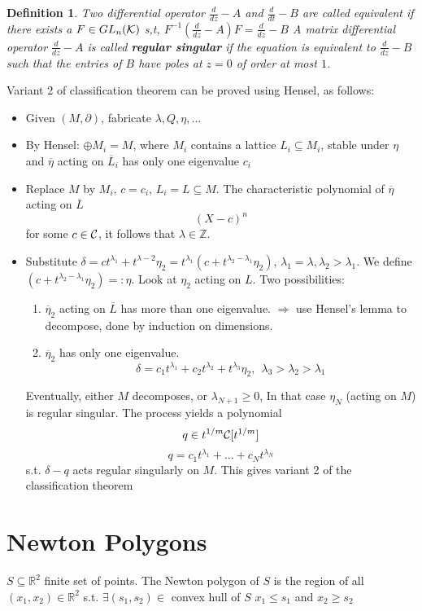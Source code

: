 \documentclass[11pt]{article}
\newtheorem{dfn}[thm]{Definition}
\newcommand{\pd}{\partial}
\newcommand{\reals}{\mathbb R}
\newcommand{\intg}{\mathbb Z}
\newcommand{\calc}{{\cal C}}
\newcommand{\calk}{{\cal K}}
\newcommand{\Lrta}{\Longrightarrow}
\begin{document}
\begin{dfn}
Two differential operator $\frac{d}{dz}-A$ and $\frac{d}{dt}-B$ are called equivalent if there exists a $F\in GL_n(\calk)$ s,t, $F^{-1}(\frac{d}{dz}-A)F=\frac{d}{dz}-B$
A matrix differential operator $\frac{d}{dz}-A$ is called \textbf{regular singular} if the equation is equivalent to $\frac{d}{dz}-B$ such that the entries of $B$ have poles at $z=0$ of order at most $1$.
\end{dfn}
Variant 2 of classification theorem can be proved using Hensel, as  follows:
\begin{itemize}
\item Given $(M,\pd)$, fabricate $\lambda,Q,\eta,...$
\item By Hensel: $\oplus M_i=M$, where $M_i$ contains a lattice $L_i\subseteq M_i$, stable under $\eta$ and $\overline{\eta}$ acting on $\overline{L}_i$ has only one eigenvalue $c_i$
\item Replace $M$ by $M_i$, $c=c_i$, $L_i=L\subseteq M$. The characteristic polynomial of $\overline{\eta}$ acting on $\overline{L}$
$$
(X-c)^n
$$
for some $c\in\calc$, it follows that $\lambda\in \intg$.
\item Substitute $\delta=c t^{\lambda_1}+t^{\lambda-2}\eta_2=t^{\lambda_1}(c+t^{\lambda_2-\lambda_1}\eta_2)$, $\lambda_1=\lambda, \lambda_2>\lambda_1$. We define $(c+t^{\lambda_2-\lambda_1}\eta_2)=:\eta$. Look at $\eta_2$ acting on $L$. Two possibilities:
\begin{enumerate}
\item $\overline{\eta}_2$ acting on $\overline{L}$ has more than one eigenvalue. $\Lrta$ use Hensel's lemma to decompose, done by induction on dimensions.
\item $\overline{\eta}_2$ has only one eigenvalue.
$$
\delta=c_1 t^{\lambda_1}+c_2 t^{\lambda_2}+t^{\lambda_3}\eta_2, \ \ \lambda_3>\lambda_2>\lambda_1
$$
\end{enumerate}
Eventually, either $M$ decomposes, or $\lambda_{N+1}\geq 0$, In that case $\eta_N$ (acting on $M$) is regular singular. The process yields a polynomial
$$
q\in t^{1/m}\calc[t^{1/m}]
$$
$$
q=c_1 t^{\lambda_1}+...+c_N t^{\lambda_N}
$$
s.t. $\delta-q$ acts regular singularly on $M$. This gives variant 2 of the classification theorem
\end{itemize}

\section{Newton Polygons}
$S\subseteq \reals^2$ finite set of points. The Newton polygon of $S$ is the region of all $(x_1,x_2)\in\reals^2$ s.t. $\exists (s_1, s_2)\in$ convex hull of $S$ $x_1\leq s_1$ and $ x_2\geq s_2$ 
\end{document}
